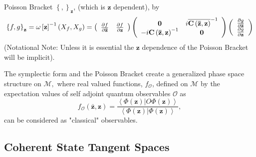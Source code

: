 \documentclass[aps,preprint]{revtex4}%
\begin{document}
Poisson Bracket $\left\{  ,\right\}  _{\mathbf{z}}$, (which is $\mathbf{z}$
dependent), by
\begin{equation}
\left\{  f,g\right\}  _{\mathbf{z}}=\omega\left[  \mathbf{z}\right]
^{-1}\left(  X_{f},X_{g}\right)  =\left(
\begin{array}
[c]{cc}%
\frac{\partial f}{\partial\mathbf{\bar{z}}} & \frac{\partial f}{\partial
\mathbf{z}}%
\end{array}
\right)  \left(
\begin{array}
[c]{cc}%
\mathbf{0} & i\overline{\mathbf{C}\left(  \mathbf{\bar{z},z}\right)  }^{-1}\\
-i\mathbf{C}\left(  \mathbf{\bar{z},z}\right)  ^{-1} & \mathbf{0}%
\end{array}
\right)  \left(
\begin{array}
[c]{c}%
\frac{\partial g}{\partial\mathbf{\bar{z}}}\\
\frac{\partial g}{\partial\mathbf{z}}%
\end{array}
\right)  \label{PB}%
\end{equation}
(Notational Note: Unless it is essential the $\mathbf{z}$ dependence of the
Poisson Bracket will be implicit).

The symplectic form and the Poisson Bracket create a generalized phase space
structure on $\mathcal{M},$ where real valued functions, $f_{\mathcal{O}}$,
defined on $\mathcal{M}$ by the expectation values of self adjoint quantum
observables $\mathcal{O}$ as
\begin{equation}
f_{\mathcal{O}}\left(  \mathbf{\bar{z},z}\right)  =\frac{\left\langle \left.
\Phi\left(  \mathbf{z}\right)  \right\vert O\Phi\left(  \mathbf{z}\right)
\right\rangle }{\left\langle \left.  \Phi\left(  \mathbf{z}\right)
\right\vert \Phi\left(  \mathbf{z}\right)  \right\rangle },
\end{equation}
can be considered as "classical" observables.

\subsection{Coherent State Tangent Spaces}
\end{document}
